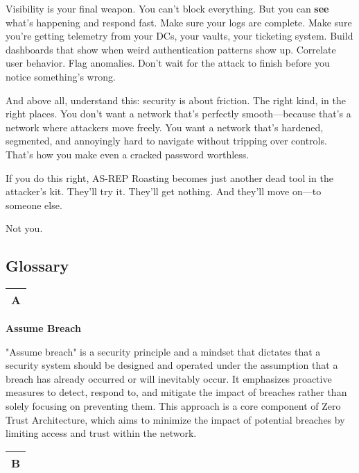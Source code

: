 Visibility is your final weapon. You can’t block everything. But you can \textbf{see} what’s happening and respond fast. Make sure your logs are complete. Make sure you’re getting telemetry from your DCs, your vaults, your ticketing system. Build dashboards that show when weird authentication patterns show up. Correlate user behavior. Flag anomalies. Don’t wait for the attack to finish before you notice something’s wrong.

And above all, understand this: security is about friction. The right kind, in the right places. You don’t want a network that’s perfectly smooth—because that’s a network where attackers move freely. You want a network that’s hardened, segmented, and annoyingly hard to navigate without tripping over controls. That’s how you make even a cracked password worthless.

If you do this right, AS-REP Roasting becomes just another dead tool in the attacker’s kit. They’ll try it. They’ll get nothing. And they’ll move on—to someone else.

Not you.

\subsection{\textbf{Glossary}}

\begin{table}
\justifying

\begin{tabular}{l}
\textbf{A} \\
\hline

\end{tabular}

\end{table}

\textbf{Assume Breach}

"Assume breach" is a security principle and a mindset that dictates that a security system should be designed and operated under the assumption that a breach has already occurred or will inevitably occur. It emphasizes proactive measures to detect, respond to, and mitigate the impact of breaches rather than solely focusing on preventing them. This approach is a core component of Zero Trust Architecture, which aims to minimize the impact of potential breaches by limiting access and trust within the network.

\begin{table}
\justifying

\begin{tabular}{l}
\textbf{B} \\
\hline

\end{tabular}

\end{table}

